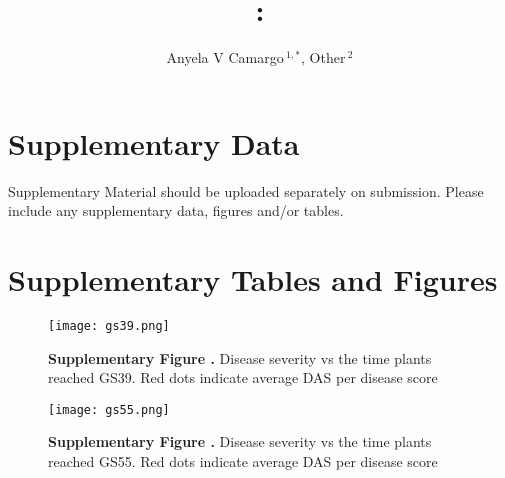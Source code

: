 \documentclass{frontiers_suppmat} %
\def\firstAuthorLast{Camargo {et~al.}} %
\def\Authors{Anyela V Camargo\,$^{1,*}$, Other\,$^{2}$}
\begin{document}
\onecolumn
{}

\title[Supplementary Material]{{}:
\\ } %

\author[\firstAuthorLast ]{\Authors} %
\correspondance{} %

\extraAuth{}%

\maketitle


\section{Supplementary Data}

Supplementary Material should be uploaded separately on submission. Please include any supplementary data, figures and/or tables. 

\section{Supplementary Tables and Figures}




\begin{figure}[h!]
\begin{center}
\texttt{[image: gs39.png]}
\end{center}
\textbf{\label{fig:01} Supplementary Figure .}{ Disease severity vs the time plants reached GS39. Red dots indicate average DAS per disease score}
\end{figure}


\begin{figure}[h!]
\begin{center}
\texttt{[image: gs55.png]}
\end{center}
\textbf{\label{fig:02} Supplementary Figure .}{ Disease severity vs the time plants reached GS55. Red dots indicate average DAS per disease score }
\end{figure}
\end{document}
